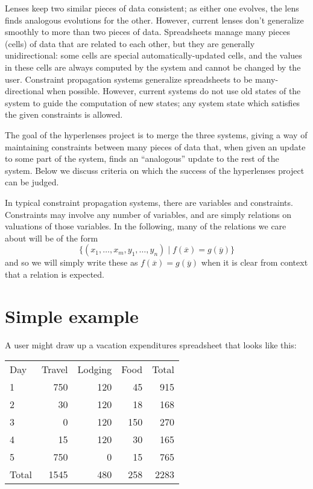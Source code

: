 Lenses keep two similar pieces of data consistent; as either one evolves,
the lens finds analogous evolutions for the other. However, current lenses
don't generalize smoothly to more than two pieces of data. Spreadsheets
manage many pieces (cells) of data that are related to each other, but they
are generally unidirectional: some cells are special automatically-updated
cells, and the values in these cells are always computed by the system and
cannot be changed by the user. Constraint propagation systems generalize
spreadsheets to be many-directional when possible. However, current systems
do not use old states of the system to guide the computation of new states;
any system state which satisfies the given constraints is allowed.

The goal of the hyperlenses project is to merge the three systems, giving a
way of maintaining constraints between many pieces of data that, when given
an update to some part of the system, finds an ``analogous'' update to the
rest of the system. Below we discuss criteria on which the success of the
hyperlenses project can be judged.

In typical constraint propagation systems, there are variables and
constraints. Constraints may involve any number of variables, and are simply
relations on valuations of those variables. In the following, many of the
relations we care about will be of the form
\[\{(x_1,\ldots,x_m,y_1,\ldots,y_n) \mid f(\overline x) = g(\overline y)\}\]
and so we will simply write these as
$f(\overline x) = g(\overline y)$
when it is clear from context that a relation is expected.

\section{Simple example}
A user might draw up a vacation expenditures spreadsheet that looks like
this:

\begin{tabular}[h]{lrrrr}
    Day     & Travel    & Lodging   & Food  & Total \\
    1       & 750       & 120       & 45    & 915   \\
    2       & 30        & 120       & 18    & 168   \\
    3       & 0         & 120       & 150   & 270   \\
    4       & 15        & 120       & 30    & 165   \\
    5       & 750       & 0         & 15    & 765   \\
    Total   & 1545      & 480       & 258   & 2283  \\
\end{tabular}

